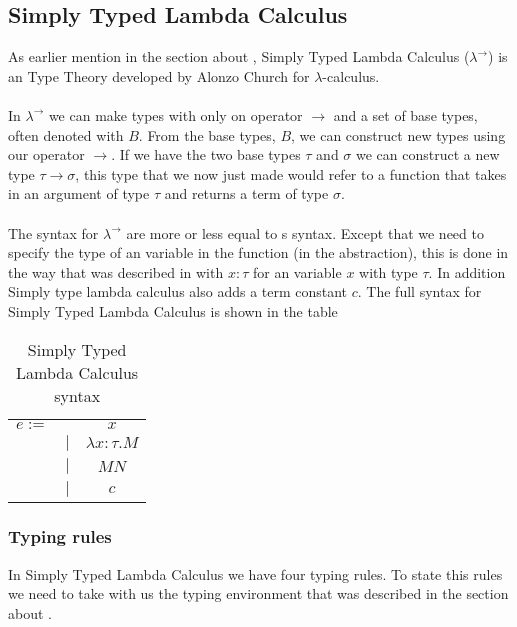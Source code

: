 \subsection{Simply Typed Lambda Calculus}
\label{Simply Typed Lambda Calculus}
As earlier mention in the section about , Simply Typed Lambda Calculus 
($\lambda^\rightarrow$) is an Type Theory developed by Alonzo Church for $\lambda$-calculus. \\ \\
In $\lambda^\rightarrow$ we can make types with only on operator $\rightarrow$ and a set of base types,
 often denoted with $B$. From the base types, $B$, we can construct new types using our operator 
 $\rightarrow$. If we have the two base types $\tau$ and $\sigma$ we can construct a new 
 type $\tau \rightarrow \sigma$, this type that we now just made would refer to a function 
 that takes in an argument of type $\tau$ and returns a term of type $\sigma$. \\ \\
The syntax for $\lambda^\rightarrow$ are more or less equal to s syntax. 
Except that we need to specify the type of an variable in the function (in the abstraction), 
this is done in the way that was described in  with $x:\tau$ for an variable $x$ with 
type $\tau$. In addition Simply type lambda calculus also adds a term constant $c$. The full syntax for 
Simply Typed Lambda Calculus is shown in the table  \\

\begin{table}[]
    \centering
    \begin{tabular}{c c c}
         $e :=$&  & $x$\\
         & $|$ & $\lambda x:\tau.M$ \\
         & $|$ &  $M N$ \\
         & $|$ &  $c$ \\
    \end{tabular}
    \caption{Simply Typed Lambda Calculus syntax}
    \label{tab:STLC syntax}
\end{table}

\subsubsection{Typing rules}
In Simply Typed Lambda Calculus we have four typing rules. To state this rules we need to take with us the typing environment that was described in the section about .


